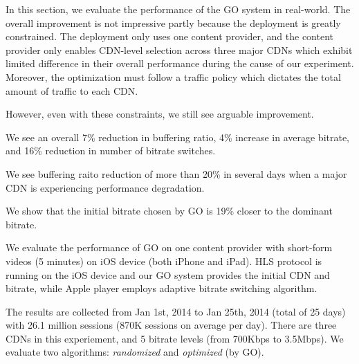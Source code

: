 




\label{sec:eval}

In this section, we evaluate the performance of the GO system in real-world. 
The overall improvement is not impressive partly because the deployment is greatly constrained. The deployment only uses one content provider, and the content provider only enables CDN-level selection across three major CDNs which exhibit limited difference in their overall performance during the cause of our experiment. Moreover, the optimization must follow a traffic policy which dictates the total amount of traffic to each CDN. 

However, even with these constraints, we still see arguable improvement. 

\begin{packedenumerate}
    \item We see an overall 7\% reduction in buffering ratio, 4\% increase in average bitrate, and 16\% reduction in number of bitrate switches.
    \item We see buffering raito reduction of more than 20\% in several days when a major CDN is experiencing performance degradation.
    \item We show that the initial bitrate chosen by GO is 19\% closer to the dominant bitrate.
\end{packedenumerate}

\label{subsec:eval_setup}

We evaluate the performance of GO on one content provider with short-form videos (5 minutes) on iOS device (both iPhone and iPad). 
HLS protocol is running on the iOS device and our GO system provides the initial CDN and bitrate, while Apple player employs adaptive 
bitrate switching algorithm. 

The results are collected from Jan 1st, 2014 to Jan 25th, 2014 (total of 25 days) with 26.1 million sessions (870K sessions on average per day).
There are three CDNs in this experiement, and 5 bitrate levels (from 700Kbps to 3.5Mbps). We evaluate two algorithms: {\it randomized} 
and {\it optimized} (by GO).


